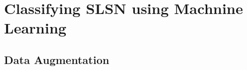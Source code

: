 
\chapter{Classifying SLSN using Machnine Learning} %
\label{Chapter1}


\section{Data Augmentation}
